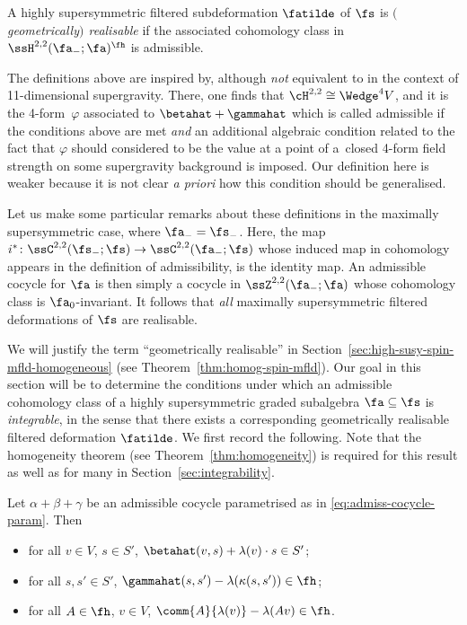 \begin{Definition}\label{def:geom-real}
	A highly supersymmetric filtered subdeformation $\fatilde$ of $\fs$ is \emph{$($geometrically$)$ realisable} if the associated cohomology class in $\ssH^{2,2}(\fa_-;\fa)^\fh$ is admissible.
\end{Definition}

The definitions above are inspired by, although \emph{not} equivalent to \cite[Definition~9]{Figueroa-OFarrill2017_1} in the context of 11-dimensional supergravity. There, one finds that $\cH^{2,2}\cong \Wedge^4V$, and it is the 4-form~$\varphi$ associated to $\betahat+\gammahat$ which is called admissible if the conditions above are met \emph{and} an additional algebraic condition related to the fact that $\varphi$ should considered to be the value at a point of a~closed 4-form field strength on some supergravity background is imposed. Our definition here is weaker because it is not clear \textit{a priori} how this condition should be generalised.

Let us make some particular remarks about these definitions in the maximally supersymmetric case, where $\fa_-=\fs_-$. Here, the map $i^*\colon\ssC^{2,2}(\fs_-;\fs)\to\ssC^{2,2}(\fa_-;\fs)$ whose induced map in cohomology appears in the definition of admissibility, is the identity map. An admissible cocycle for $\fa$ is then simply a cocycle in $\ssZ^{2,2}(\fa_-;\fa)$ whose cohomology class is $\fa_0$-invariant. It follows that \emph{all} maximally supersymmetric filtered deformations of $\fs$ are realisable.

We will justify the term ``geometrically realisable'' in Section~\ref{sec:high-susy-spin-mfld-homogeneous} (see Theorem~\ref{thm:homog-spin-mfld}). Our goal in this section will be to determine the conditions under which an admissible cohomology class of a highly supersymmetric graded subalgebra $\fa\subseteq\fs$ is \emph{integrable}, in the sense that there exists a corresponding geometrically realisable filtered deformation $\fatilde$. We first record the following. Note that the homogeneity theorem (see Theorem~\ref{thm:homogeneity}) is required for this result as well as for many in Section~\ref{sec:integrability}.

\begin{Lemma}\label{lemma:admiss-props}
	Let $\alpha+\beta+\gamma$ be an admissible cocycle parametrised as in \eqref{eq:admiss-cocycle-param}. Then
	\begin{itemize}\itemsep=0pt
		\item for all $v\in V$, $s\in S'$, $\betahat(v,s)+\lambda(v)\cdot s \in S'$;
		\item for all $s,s'\in S'$, $\gammahat(s,s')-\lambda(\kappa(s,s'))\in\fh$;
		\item for all $A\in\fh$, $v\in V$, $\comm{A}{\lambda(v)}-\lambda(Av)\in\fh$.
	\end{itemize}
\end{Lemma}

